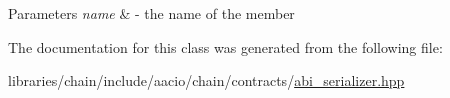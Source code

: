\begin{DoxyParams}{Parameters}
{\em name} & -\/ the name of the member \\
\hline
\end{DoxyParams}


The documentation for this class was generated from the following file\+:\begin{DoxyCompactItemize}
\item 
libraries/chain/include/aacio/chain/contracts/\mbox{\hyperlink{abi__serializer_8hpp}{abi\+\_\+serializer.\+hpp}}\end{DoxyCompactItemize}
